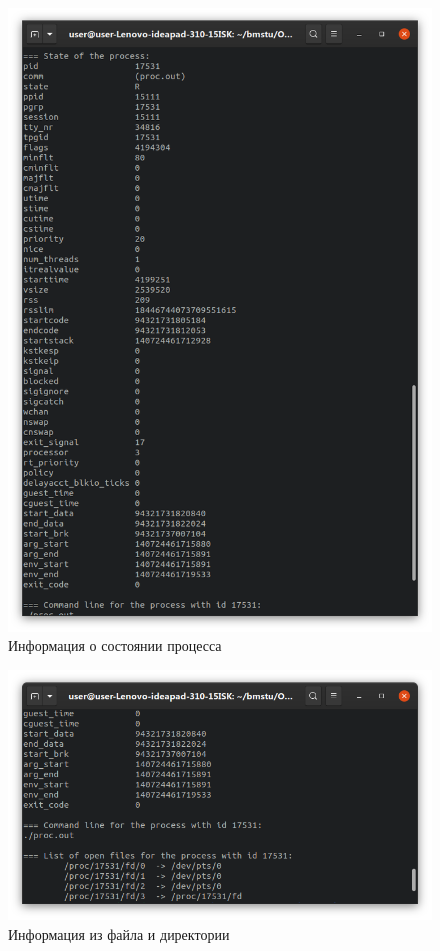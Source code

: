 \documentclass[a4paper,oneside,12pt]{extreport}
\begin{document}
\begin{figure}[H]
	\centering
	\includegraphics[scale=0.4425]{inc/img/task1-stat}
	\caption{Информация о состоянии процесса}
	\label{img:task1-stat}
\end{figure}

\begin{figure}[H]
	\centering
	\includegraphics[scale=0.4425]{inc/img/task1-cmdline-fd}
	\caption{Информация из файла  и директории }
	\label{img:task1-cmdline-fd}
\end{figure}
\end{document}
